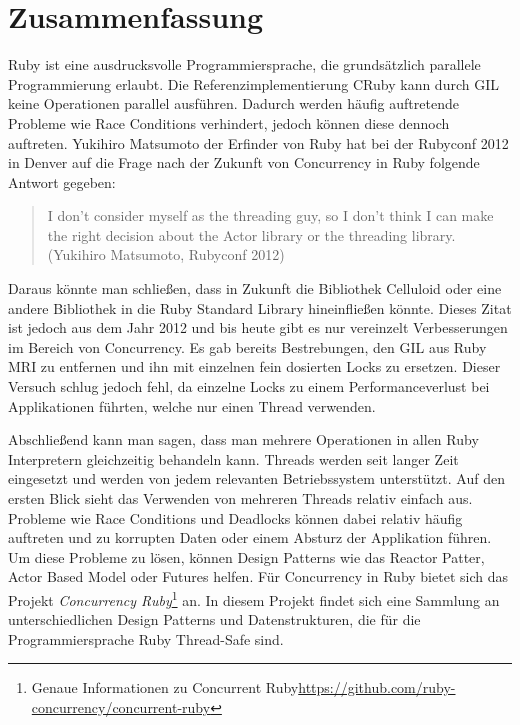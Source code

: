 \section{Zusammenfassung}
Ruby ist eine ausdrucksvolle Programmiersprache, die grundsätzlich parallele Programmierung erlaubt. Die Referenzimplementierung CRuby kann durch GIL keine Operationen parallel ausführen. Dadurch werden häufig auftretende Probleme wie Race Conditions verhindert, jedoch können diese dennoch auftreten. Yukihiro Matsumoto der Erfinder von Ruby hat bei der Rubyconf 2012 in Denver auf die Frage nach der Zukunft von Concurrency in Ruby folgende Antwort gegeben:

\begin{quote}
I don't consider myself as the threading guy, so I don't think I can make the right decision about the Actor library or the threading library.
 (Yukihiro Matsumoto, Rubyconf 2012)
\end{quote}

Daraus könnte man schließen, dass in Zukunft die Bibliothek Celluloid oder eine andere Bibliothek in die Ruby Standard Library hineinfließen könnte. Dieses Zitat ist jedoch aus dem Jahr 2012 und bis heute gibt es nur vereinzelt Verbesserungen im Bereich von Concurrency. Es gab bereits Bestrebungen, den GIL aus Ruby MRI zu entfernen und ihn mit einzelnen fein dosierten Locks zu ersetzen. Dieser Versuch schlug jedoch fehl, da einzelne Locks zu einem Performanceverlust bei Applikationen führten, welche nur einen Thread verwenden. 

Abschließend kann man sagen, dass man mehrere Operationen in allen Ruby Interpretern gleichzeitig behandeln kann. Threads werden seit langer Zeit eingesetzt und werden von jedem relevanten Betriebssystem unterstützt. Auf den ersten Blick sieht das Verwenden von mehreren Threads relativ einfach aus. Probleme wie Race Conditions und Deadlocks können dabei relativ häufig auftreten und zu korrupten Daten oder einem Absturz der Applikation führen. Um diese Probleme zu lösen, können Design Patterns wie das Reactor Patter, Actor Based Model oder Futures helfen. Für Concurrency in Ruby bietet sich das Projekt \emph{Concurrency Ruby}\footnote{Genaue Informationen zu Concurrent Ruby\url{https://github.com/ruby-concurrency/concurrent-ruby}} an. In diesem Projekt findet sich eine Sammlung an unterschiedlichen Design Patterns und Datenstrukturen, die für die Programmiersprache Ruby Thread-Safe sind.

